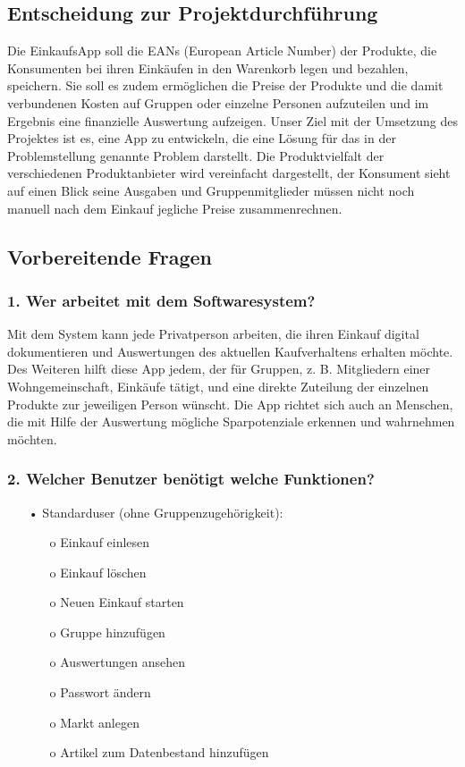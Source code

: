 \documentclass[12pt,a4paper]{article}
\begin{document}
\subsection{Entscheidung zur Projektdurchführung}
Die EinkaufsApp soll die EANs (European Article Number) der Produkte, die Konsumenten bei ihren Einkäufen in den Warenkorb legen und bezahlen, speichern.
Sie soll es zudem ermöglichen die Preise der Produkte und die damit verbundenen Kosten auf Gruppen oder einzelne Personen aufzuteilen und im Ergebnis eine finanzielle Auswertung aufzeigen.
Unser Ziel mit der Umsetzung des Projektes ist es, eine App zu entwickeln, die eine Lösung für das in der Problemstellung genannte Problem darstellt. 
Die Produktvielfalt der verschiedenen Produktanbieter wird vereinfacht dargestellt, der Konsument sieht auf einen Blick seine Ausgaben und Gruppenmitglieder müssen nicht noch manuell nach dem Einkauf jegliche Preise zusammenrechnen.

\newpage
\subsection{Vorbereitende Fragen}
\subsubsection*{1. Wer arbeitet mit dem Softwaresystem?}
Mit dem System kann jede Privatperson arbeiten, die ihren Einkauf digital dokumentieren und Auswertungen des aktuellen Kaufverhaltens erhalten möchte. Des Weiteren hilft diese App jedem, der für Gruppen, z. B. Mitgliedern einer Wohngemeinschaft, Einkäufe tätigt, und eine direkte Zuteilung der einzelnen Produkte zur jeweiligen Person wünscht. Die App richtet sich auch an Menschen, die mit Hilfe der Auswertung mögliche Sparpotenziale erkennen und wahrnehmen möchten. 
 
\subsubsection*{2. Welcher Benutzer benötigt welche Funktionen?}
\begin{itemize}
\item[•]Standarduser (ohne Gruppenzugehörigkeit):
\begin{itemize}
\item[o] Einkauf einlesen
\item[o] Einkauf löschen
\item[o] Neuen Einkauf starten
\item[o] Gruppe hinzufügen
\item[o] Auswertungen ansehen
\item[o] Passwort ändern
\item[o] Markt anlegen
\item[o] Artikel zum Datenbestand hinzufügen
\end{itemize}       
\end{itemize} 
\end{document}
